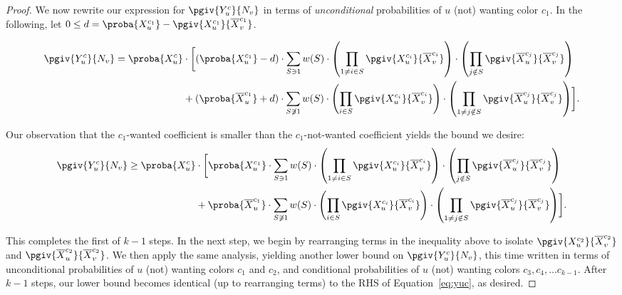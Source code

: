 \begin{proof}
	We now rewrite our expression for $\pgiv{Y_u^c}{N_v}$ in terms of \emph{unconditional} probabilities of $u$ (not) wanting color $c_1$. In the following, let
	$0 \leq d = \proba{X_u^{c_1}} - \pgiv{X_u^{c_1}}{\overline{X}_v^{c_1}}$.

	\begin{align*}
		\begin{split}
			\pgiv{Y_u^c}{N_v} = \proba{X_u^c} & \cdot \biggl[ (\proba{X_u^{c_1}} - d)\cdot\sum_{S \ni 1} w(S)\cdot \left( \prod_{1 \neq i \in S}\pgiv{X_u^{c_i}}{\overline{X}_v^{c_i}}\right)\cdot\left(\prod_{j \notin S}\pgiv{\overline{X}_u^{c_j}}{\overline{X}_v^{c_j}}\right)                \\
			                                  & + (\proba{\overline{X}_u^{c_1}} + d)\cdot \sum_{S \not\ni 1} w(S) \cdot  \left( \prod_{i \in S}\pgiv{X_u^{c_i}}{\overline{X}_v^{c_i}}\right)\cdot\left(\prod_{1 \neq j \notin S}\pgiv{\overline{X}_u^{c_j}}{\overline{X}_v^{c_j}}\right) \biggr].
		\end{split}
	\end{align*}

	Our observation that the $c_1$-wanted coefficient is smaller than the $c_1$-not-wanted coefficient yields the bound we desire:
	\begin{align*}
		\begin{split}
			\pgiv{Y_u^c}{N_v} \geq \proba{X_u^c} & \cdot \biggl[ \proba{X_u^{c_1}}\cdot\sum_{S \ni 1} w(S)\cdot \left( \prod_{1 \neq i \in S}\pgiv{X_u^{c_i}}{\overline{X}_v^{c_i}}\right)\cdot\left(\prod_{j \notin S}\pgiv{\overline{X}_u^{c_j}}{\overline{X}_v^{c_j}}\right)                \\
			                                     & + \proba{\overline{X}_u^{c_1}}\cdot \sum_{S \not\ni 1} w(S) \cdot  \left( \prod_{i \in S}\pgiv{X_u^{c_i}}{\overline{X}_v^{c_i}}\right)\cdot\left(\prod_{1 \neq j \notin S}\pgiv{\overline{X}_u^{c_j}}{\overline{X}_v^{c_j}}\right) \biggr].
		\end{split}
	\end{align*}

	This completes the first of $k - 1$ steps. In the next step, we begin by rearranging terms in the inequality above to isolate $\pgiv{X_u^{c_2}}{\overline{X}_v^{c_2}}$ and $\pgiv{\overline{X}_u^{c_2}}{\overline{X}_v^{c_2}}$. We then apply the same analysis, yielding another lower bound on $\pgiv{Y_u^c}{N_v}$, this time written
	in terms of unconditional probabilities of $u$ (not) wanting colors $c_1$ and $c_2$, and conditional probabilities of $u$ (not) wanting colors $c_3, c_4, \ldots c_{k-1}$. After $k - 1$ steps, our lower bound becomes identical (up to rearranging terms) to the RHS of Equation~\ref{eq:yuc}, as desired.
\end{proof}

